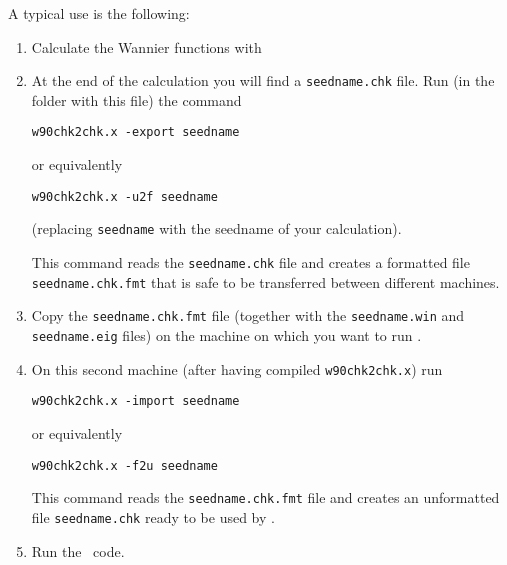 A typical use is the following:
\begin{enumerate}
\item Calculate the Wannier functions with \wannier
\item At the end of the calculation you will find a \verb|seedname.chk|
  file. Run (in the folder with this file) the command
\begin{verbatim}
w90chk2chk.x -export seedname
\end{verbatim}
or equivalently
\begin{verbatim}
w90chk2chk.x -u2f seedname
\end{verbatim}
(replacing \verb|seedname| with the seedname of your calculation).

This command reads the \verb|seedname.chk| file and creates a
formatted file  \verb|seedname.chk.fmt| that is safe to be transferred
between different machines.
\item Copy the \verb|seedname.chk.fmt| file (together with the
  \verb|seedname.win| and \verb|seedname.eig| files) on the machine on
  which you want to run \postw.
\item On this second machine (after having compiled
  \verb|w90chk2chk.x|) run
\begin{verbatim}
w90chk2chk.x -import seedname
\end{verbatim}
or equivalently
\begin{verbatim}
w90chk2chk.x -f2u seedname
\end{verbatim}

This command reads the \verb|seedname.chk.fmt| file and creates an
unformatted file  \verb|seedname.chk| ready to be used by \postw.

\item Run the \postw\ code.

\end{enumerate}